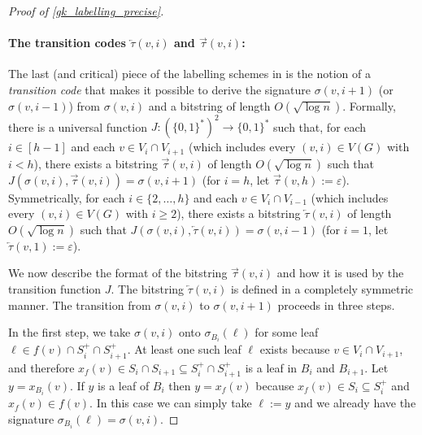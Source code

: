\documentclass{patmorin}
\renewcommand{\ge}{\geqslant}
\newcommand{\defin}[1]{\emph{\textcolor{brightmaroon}{#1}}}
\newcommand{\Oh}{O}
\begin{document}
\begin{proof}[Proof of \cref{gk_labelling_precise}]
  \paragraph{\boldmath The transition codes $\overleftarrow{\tau}(v,i)$ and $\overrightarrow{\tau}(v,i)$:}
  The last (and critical) piece of the labelling schemes in \cite{dujmovic.esperet.ea:adjacency,gawrychowski.janczewski:simpler} is the notion of a \defin{transition code} that makes it possible to derive the signature $\sigma(v,i+1)$ (or $\sigma(v,i-1)$) from $\sigma(v,i)$ and a bitstring of length $\Oh(\sqrt{\log n})$. Formally, there is a universal function $J:(\{0,1\}^*)^2\to\{0,1\}^*$ such that, for each $i\in[h-1]$ and each $v\in V_i\cap V_{i+1}$ (which includes every $(v,i)\in V(G)$ with $i< h$), there exists a bitstring \defin{$\overrightarrow{\tau}(v,i)$} of length $\Oh(\sqrt{\log n})$ such that $J(\sigma(v,i),\overrightarrow{\tau}(v,i))=\sigma(v,i+1)$ (for $i=h$, let $\overrightarrow{\tau}(v,h):=\varepsilon$). Symmetrically, for each $i\in\{2,\ldots,h\}$ and each $v\in V_i\cap V_{i-1}$ (which includes every $(v,i)\in V(G)$ with $i\ge 2$), there exists a bitstring \defin{$\overleftarrow{\tau}(v,i)$} of length $\Oh(\sqrt{\log n})$ such that $J(\sigma(v,i),\overleftarrow{\tau}(v,i))=\sigma(v,i-1)$ (for $i=1$, let $\overleftarrow{\tau}(v,1):=\varepsilon$).

  We now describe the format of the bitstring $\overrightarrow{\tau}(v,i)$ and how it is used by the transition function $J$.  The bitstring $\overleftarrow{\tau}(v,i)$ is defined in a completely symmetric manner.  The transition from $\sigma(v,i)$ to $\sigma(v,i+1)$ proceeds in three steps.

  In the first step, we take $\sigma(v,i)$ onto $\sigma_{B_i}(\ell)$ for some leaf $\ell\in f(v)\cap S^+_{i}\cap S^+_{i+1}$. At least one such leaf $\ell$ exists because $v\in V_i\cap V_{i+1}$, and therefore $x_f(v)\in S_i\cap S_{i+1}\subseteq S^+_i\cap S^+_{i+1}$ is a leaf in $B_i$ and $B_{i+1}$. Let $y=x_{B_i}(v)$.  If $y$ is a leaf of $B_i$ then $y= x_f(v)$ because $x_f(v)\in S_i\subseteq S^+_i$ and $x_f(v)\in f(v)$.  In this case we can simply take $\ell:=y$ and we already have the signature $\sigma_{B_i}(\ell)=\sigma(v,i)$.  
  

\end{proof}
\end{document}
